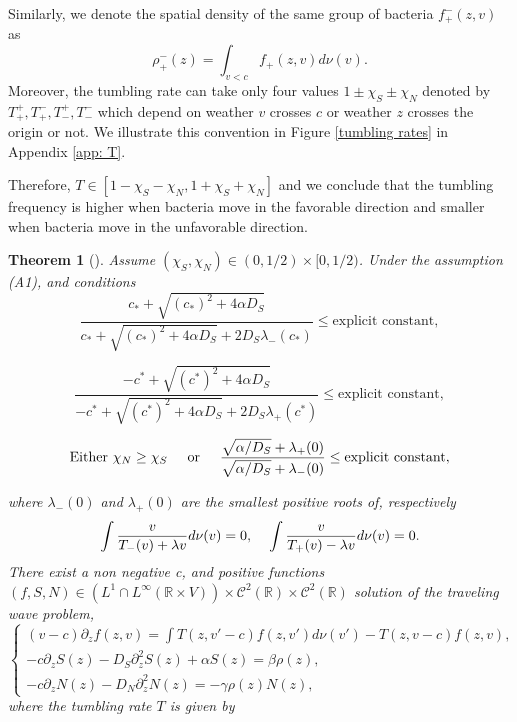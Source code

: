\documentclass[11pt,twoside]{article}
\numberwithin{equation}{section}
\theoremstyle{plain}
\newtheorem{theorem}{Theorem}[section]
\theoremstyle{nonumberplain}
\begin{document}
Similarly, we denote the spatial density of the same group of bacteria $f^-_+(z,v)$ as 
\[
    \rho^-_+(z) = \int_{v<c} f_+(z,v)d\nu(v).
\]
Moreover, the tumbling rate can take only four values $1\pm\chi_S\pm\chi_N$ denoted by $T^+_+, T^-_+, T^+_-, T^-_-$ which depend on weather $v$ crosses $c$ or weather $z$ crosses the origin or not. We illustrate this convention in Figure \ref{tumbling rates} in Appendix \ref{app: T}.




Therefore, $T\in[1-\chi_S-\chi_N, 1+\chi_S+\chi_N]$ and we conclude that the tumbling frequency is higher when bacteria move in the favorable direction and smaller when bacteria move in the unfavorable direction.

\begin{theorem}[\cite{calvez2019chemotactic}] \label{theorem_existence_mesos}
 Assume $(\chi_S, \chi_N) \in (0, 1/2) \times [0, 1/2)$. Under the assumption (A1), and conditions 
\begin{equation} 
    \frac{c_* + \sqrt{(c_*)^2 + 4 \alpha D_S}}{c_* + \sqrt{(c_*)^2 + 4 \alpha D_S} + 2D_S \lambda_-(c_*)} \le \text{explicit constant},
    \label{constraint1}
\end{equation}

\begin{equation}
    \frac{-c^* + \sqrt{(c^*)^2 + 4 \alpha D_S}}{-c^* + \sqrt{(c^*)^2 + 4 \alpha D_S} + 2D_S \lambda_+(c^*)} \le \text{explicit constant},
    \label{constraint2}
\end{equation}

\begin{equation}
    \text{Either } \chi_N \ge \chi_S \hspace{0.5cm} \text{or} \hspace{0.5cm} \frac{\sqrt{\alpha / D_S} + \lambda_+ (0)}{\sqrt{\alpha / D_S} + \lambda_- (0)} \le \text{explicit constant},
    \label{constraint3}
\end{equation}

where $\lambda_-(0)$ and $\lambda_+(0)$
 are the smallest positive roots of, respectively 
 \begin{equation}
     \int \frac{v}{T_-(v) + \lambda v} d\nu (v) = 0, \hspace{0.4cm} \int \frac{v}{T_+(v) - \lambda v} d \nu (v) = 0.
     \nonumber
 \end{equation}
 There exist a non negative c, and positive functions $(f, S, N) \in (L^1 \cap L^\infty (\mathbb{R} \times V)) \times \mathcal{C}^2(\mathbb{R}) \times \mathcal{C}^2 (\mathbb{R})$ solution of the traveling wave problem,
 \begin{equation}
         \left \{
    \begin{aligned}
       (v-c) \partial_z f(z,v) = \int T(z, v'-c)f(z,v') d\nu (v') - T(z, v-c)f(z,v),\\
       -c \partial_z S(z) - D_S \partial_z^2 S(z) + \alpha S(z) = \beta \rho (z),\\
       -c \partial_z N(z) - D_N \partial_z^2 N(z) = - \gamma \rho (z) N(z),
    \end{aligned}
  \right .
  \label{eq_sys_mesoscopic}
\end{equation}
where the tumbling rate $T$ is given by 


\end{theorem}
\end{document}
